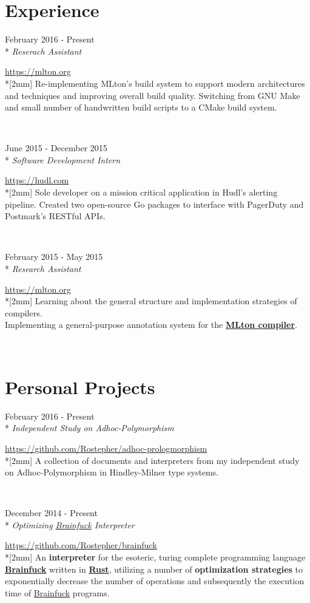 \documentclass[a4paper,margin,line]{resume}
\newcommand{\rvspace}{2mm} %
\newcommand{\rurl}[1]{\hfill {\footnotesize \url{#1}}}
\newcommand{\rdate}[1]{\hfill {\small #1}}
\newcommand{\rdescription}[1]{\small #1 \normalsize}
\newcommand{\ritem}[5] {
    \item[#1]                               %
    \hfill \rdate{#2} \\*                   %
    \hfill {\small \emph{#3}}               %
    \strut \hfill \rurl{#4} \\*[\rvspace]   %
    \rdescription{#5}                       %
}
\newcommand{\remployer}{\ritem}
\newcommand{\rproject}{\ritem}
\begin{document}
\begin{resume}
\section{\mysidestyle Experience}
\begin{asparadesc}
    \remployer {Rochester Institute of Technology}
               {February 2016 - Present}
               {Reserach Assistant}
               {https://mlton.org}
    {
        Re-implementing MLton's build system to support modern architectures and
        techniques and improving overall build quality. Switching from GNU Make
        and small number of handwritten build scripts to a CMake build system.
    }
    \\

    \remployer {Hudl}
               {June 2015 - December 2015}
               {Software Development Intern}
               {https://hudl.com}
    {
        Sole developer on a mission critical application in Hudl's alerting
        pipeline. Created two open-source Go packages to interface with PagerDuty
        and Postmark's RESTful APIs.
    }
    \\

    \remployer {Rochester Institute of Technology}
               {February 2015 - May 2015}
               {Research Assistant}
               {https://mlton.org}
    {
        Learning about the general structure and implementation strategies
        of compilers.\\
        Implementing a general-purpose annotation system for the
        \href{https://mlton.org}{\bf MLton compiler}.
    }
    \\
\end{asparadesc}

\section{\mysidestyle Personal Projects}
\begin{asparadesc}
    \rproject {adhoc-prologmorphism}
              {February 2016 - Present}
              {Independent Study on Adhoc-Polymorphism}
              {https://github.com/Rostepher/adhoc-prologmorphism}
    {
        A collection of documents and interpreters from my independent study on
        Adhoc-Polymorphism in Hindley-Milner type systems.
    }
    \\

    \rproject {brainfuck}
              {December 2014 - Present}
              {Optimizing \href{https://en.wikipedia.org/wiki/Brainfuck}
                               {Brainfuck} Interpreter}
              {https://github.com/Rostepher/brainfuck}
    {
        An {\bf interpreter} for the esoteric, turing complete programming
        language \href{https://en.wikipedia.org/wiki/Brainfuck}{\bf Brainfuck}
        written in \href{https://rust-lang.org}{\bf Rust}, utilizing a
        number of {\bf optimization strategies} to exponentially decrease
        the number of operations and subsequently the execution time of
        \href{https://en.wikipedia.org/wiki/Brainfuck}{Brainfuck} programs.
    }
    \\


\end{asparadesc}
\end{resume}
\end{document}
